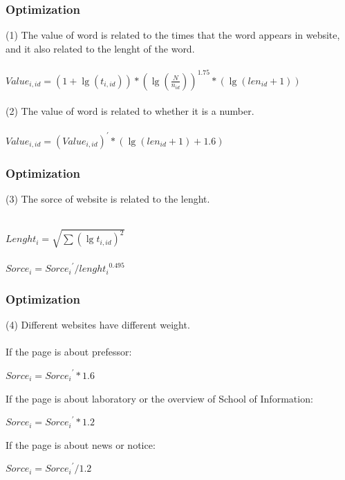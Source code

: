 \documentclass{beamer}
\begin{document}
\begin{frame}
	\frametitle{Optimization}
	(1) The value of word is related to the times that the word appears in website, and it also related to the lenght of the word.
	\\ \hspace*{\fill} \\
	$Value_{i,id} = (1 + \lg(t_{i,id})) * (\lg(\frac{N}{n_{id}}))^{1.75} * (\lg(len_{id}+1))$
	\\ \hspace*{\fill} \\
	(2) The value of word is related to whether it is a number.
	\\ \hspace*{\fill} \\
	$Value_{i,id} = (Value_{i,id})^{'} * (\lg(len_{id} + 1) + 1.6)$
\end{frame}

\begin{frame}
	\frametitle{Optimization}
	(3) The sorce of website is related to the lenght.
	\\ \hspace*{\fill} \\
	\begin{center}
		$Lenght_i = \sqrt{\sum{({\lg{t_{i,id}}})^2}}$
		\\ \hspace*{\fill} \\
		$Sorce_i = {Sorce_i}^{'} / {lenght_i}^{0.495}$
	\end{center}
		
\end{frame}

\begin{frame}
	\frametitle{Optimization}
	(4) Different websites have different weight.
	\\ \hspace*{\fill} \\
	If the page is about prefessor: 
	
	\begin{center}
		$Sorce_i = {Sorce_i}^{'} * 1.6 $
	\end{center}
	
	If the page is about laboratory or the overview of School of Information: 
	
	\begin{center}
		$Sorce_i = {Sorce_i}^{'} * 1.2 $
	\end{center}
	
	If the page is about news or notice: 
	
	\begin{center}
		$Sorce_i = {Sorce_i}^{'} / 1.2 $
	\end{center}

\end{frame}
\end{document}
